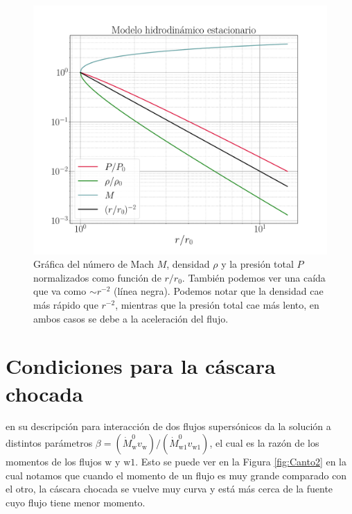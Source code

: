 \documentclass{book}
\begin{document}
\begin{figure}[htb]
    \centering    \includegraphics[width=\textwidth]{Nuevas imagenes finales/C2_estructura.pdf}
    \caption{Gráfica del número de Mach $M$, densidad $\rho$ y la presión total $P$ normalizados como función de $r/r_0$. También podemos ver una caída que va como $\sim r^{-2}$ (línea negra). Podemos notar que la densidad cae más rápido que $r^{-2}$, mientras que la presión total cae más lento, en ambos casos se debe a la aceleración del flujo.
    }
    \label{fig:grafica_C2}
\end{figure}

\section{Condiciones para la cáscara chocada}

\cite{Canto:1996} en su descripción para interacción de dos flujos supersónicos da la solución a distintos parámetros $\beta=(\dot{M}^0_\mathrm{w} v_\mathrm{w})/(\dot{M}^0_\mathrm{w1}v_\mathrm{w1})$, el cual es la razón de los momentos de los flujos $\mathrm{w}$ y $\mathrm{w1}$. Esto se puede ver en la Figura \ref{fig:Canto2} en la cual notamos que cuando el momento de un flujo es muy  grande comparado con el otro, la cáscara chocada se vuelve muy curva y está más cerca de la fuente cuyo flujo tiene menor momento.
\end{document}
